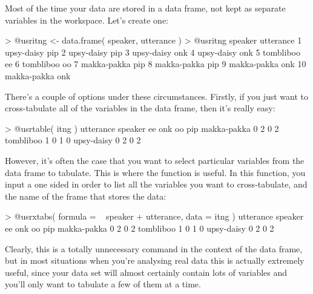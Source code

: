 Most of the time your data are stored in a data frame, not kept as separate variables in the workspace. Let's create one:
\begin{rblock1}
> @usr{itng <- data.frame( speaker, utterance )}
> @usr{itng}
       speaker utterance
1   upsy-daisy       pip
2   upsy-daisy       pip
3   upsy-daisy       onk
4   upsy-daisy       onk
5    tombliboo        ee
6    tombliboo        oo
7  makka-pakka       pip
8  makka-pakka       pip
9  makka-pakka       onk
10 makka-pakka       onk
\end{rblock1}
There's a couple of options under these circumstances. Firstly, if you just want to cross-tabulate all of the variables in the data frame, then it's really easy:
\begin{rblock1}
> @usr{table( itng )}
             utterance
speaker       ee onk oo pip
  makka-pakka  0   2  0   2
  tombliboo    1   0  1   0
  upsy-daisy   0   2  0   2
\end{rblock1}
However, it's often the case that you want to select particular variables from the data frame to tabulate. This is where the  function is useful. In this function, you input a one sided  in order to list all the variables you want to cross-tabulate, and the name of the  frame that stores the data:
\begin{rblock1}
> @usr{xtabs( formula = ~ speaker + utterance, data = itng )}
             utterance
speaker       ee onk oo pip
  makka-pakka  0   2  0   2
  tombliboo    1   0  1   0
  upsy-daisy   0   2  0   2
\end{rblock1}
Clearly, this is a totally unnecessary command in the context of the  data frame, but in most situations when you're analysing real data this is actually extremely useful, since your data set will almost certainly contain lots of variables and you'll only want to tabulate a few of them at a time.




